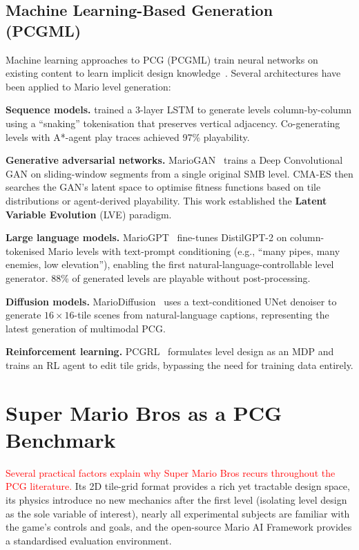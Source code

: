 \documentclass[shortabstract, mgr, english]{iithesis}
\newcommand{\changed}[1]{\textcolor{red}{#1}}
\begin{document}
\subsection{Machine Learning-Based Generation (PCGML)}
\label{subsec:bg-pcgml}

Machine learning approaches to PCG (PCGML) train neural networks on existing
content to learn implicit design knowledge~\citep{summerville2018pcgml}. Several
architectures have been applied to Mario level generation:

\textbf{Sequence models.} \citet{summerville2016super} trained a 3-layer LSTM to
generate levels column-by-column using a ``snaking'' tokenisation that preserves
vertical adjacency. Co-generating levels with A*-agent play traces achieved
97\% playability.

\textbf{Generative adversarial networks.} MarioGAN~\citep{volz2018evolving}
trains a Deep Convolutional GAN on sliding-window segments from a single
original SMB level. CMA-ES then searches the GAN's latent space to optimise
fitness functions based on tile distributions or agent-derived playability. This
work established the \textbf{Latent Variable Evolution} (LVE) paradigm.

\textbf{Large language models.} MarioGPT~\citep{sudhakaran2023mariogpt}
fine-tunes DistilGPT-2 on column-tokenised Mario levels with text-prompt
conditioning (e.g., ``many pipes, many enemies, low elevation''), enabling the
first natural-language-controllable level generator. 88\% of generated levels
are playable without post-processing.

\textbf{Diffusion models.} MarioDiffusion~\citep{schrum2025mariodiffusion} uses a
text-conditioned UNet denoiser to generate $16 \times 16$-tile scenes from
natural-language captions, representing the latest generation of multimodal PCG.

\textbf{Reinforcement learning.} PCGRL~\citep{khalifa2020pcgrl} formulates level
design as an MDP and trains an RL agent to edit tile grids, bypassing the need
for training data entirely.


\section{Super Mario Bros as a PCG Benchmark}
\label{sec:bg-mario}

\changed{Several practical factors explain why Super Mario Bros recurs throughout the
PCG literature.} Its 2D tile-grid format provides a rich yet tractable design space, its
physics introduce no new mechanics after the first level (isolating level design
as the sole variable of interest), nearly all experimental subjects are familiar
with the game's controls and goals, and the open-source Mario AI Framework
provides a standardised evaluation environment.
\end{document}
